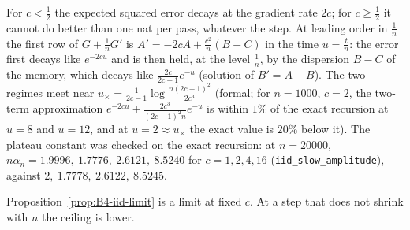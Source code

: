 \begin{remark}[reading (R1)]\label{rem:B4-iid-reading}
For $c<\frac12$ the expected squared error decays at the gradient rate $2c$; for $c\ge\frac12$ it cannot do better than one nat per pass, whatever the step. At leading order in $\frac1n$ the first row of $G+\frac1nG'$ is $A'=-2cA+\frac{c^2}n(B-C)$ in the time $u=\frac tn$: the error first decays like $e^{-2cu}$ and is then held, at the level $\frac1n$, by the dispersion $B-C$ of the memory, which decays like $\frac{2c}{2c-1}e^{-u}$ (solution of $B'=A-B$). The two regimes meet near $u_\times=\frac1{2c-1}\log\frac{n(2c-1)^2}{2c^3}$ (formal; for $n=1000$, $c=2$, the two-term approximation $e^{-2cu}+\frac{2c^3}{(2c-1)^2n}e^{-u}$ is within $1\%$ of the exact recursion at $u=8$ and $u=12$, and at $u=2\approx u_\times$ the exact value is $20\%$ below it). The plateau constant was checked on the exact recursion: at $n=20000$, $n\alpha_n=1.9996,\ 1.7776,\ 2.6121,\ 8.5240$ for $c=1,2,4,16$ (\texttt{iid\_slow\_amplitude}), against $2,\ 1.7778,\ 2.6122,\ 8.5245$.
\end{remark}

Proposition~\ref{prop:B4-iid-limit} is a limit at fixed $c$. At a step that does not shrink with $n$ the ceiling is lower.

